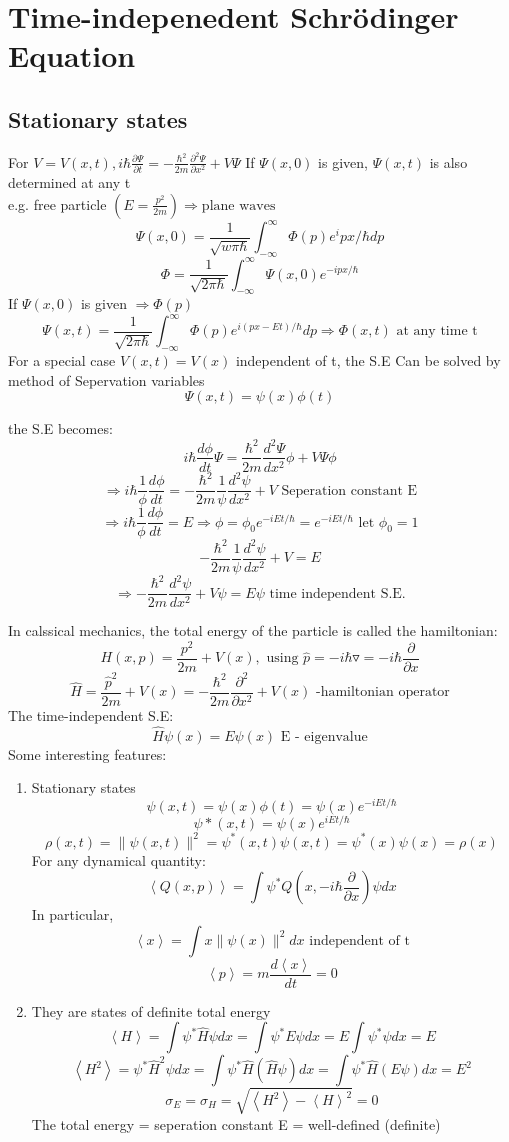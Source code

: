 \documentclass[12pt, a4paper]{article}
\begin{document}
\section{Time-indepenedent Schr\"odinger Equation}
\subsection{Stationary states}
For $V=V(x,t),i\hbar \frac{\partial \Psi}{\partial t}=-\frac{\hbar^2}{2m}\frac{\partial^2\Psi}{\partial x^2}+V\Psi$
If $\Psi(x,0)$ is given, $\Psi(x,t)$ is also determined at any t\\
e.g. free particle $(E=\frac{p^2}{2m})\Rightarrow\text{plane waves}$
$$\Psi(x,0)=\frac{1}{\sqrt{w\pi\hbar}}\int_{-\infty}^{\infty}\Phi(p)e^ipx/\hbar dp$$
$$\Phi=\frac{1}{\sqrt{2\pi \hbar}}\int_{-\infty}^{\infty}\Psi(x,0)e^{-ipx/\hbar}$$
If $\Psi(x,0)$ is given $\Rightarrow \Phi(p)$
$$\Psi(x,t)=\frac{1}{\sqrt{2\pi \hbar}}\int_{-\infty}^{\infty}\Phi(p)e^{i(px-Et)/\hbar}dp\Rightarrow \Phi(x,t) \text{ at any time t}$$ 
For a special case $V(x,t)=V(x)$ independent of t, the S.E Can be solved by method of Sepervation variables
$$\Psi(x,t)=\psi(x)\phi(t)$$

the S.E becomes:
$$i\hbar \frac{d\phi}{dt}\Psi = \frac{\hbar^2}{2m}\frac{d^2\Psi}{dx^2}\phi+V\Psi \phi$$
$$\Rightarrow i\hbar \frac{1}{\phi}\frac{d\phi}{dt}=-\frac{\hbar^2}{2m}\frac{1}{\psi}\frac{d^2\psi}{dx^2}+V\text{ Seperation constant E}$$
$$\Rightarrow i\hbar \frac{1}{\phi}\frac{d\phi}{dt}=E \Rightarrow\phi=\phi_0e^{-iEt/\hbar}=e^{-iEt/\hbar} \text{ let } \phi_0=1$$
$$-\frac{\hbar^2}{2m}\frac{1}{\psi}\frac{d^2\psi}{dx^2}+V=E$$
$$\Rightarrow -\frac{\hbar^2}{2m}\frac{d^2\psi}{dx^2}+V\psi=E\psi \text{ time independent S.E.}$$

In calssical mechanics, the total energy of the particle is called the hamiltonian: $$H(x,p)=\frac{p^2}{2m}+V(x), \text{ using } \hat p=-i\hbar \triangledown=-i\hbar \frac{\partial}{\partial x}$$
$$\hat H=\frac{\hat p^2}{2m}+V(x)=-\frac{\hbar^2}{2m}\frac{\partial ^2}{\partial x^2}+V(x) \text{ -hamiltonian operator}$$
The time-independent S.E: $$\hat H \psi(x)=E\psi(x) \text{ E - eigenvalue}$$
Some interesting features:
\begin{enumerate}
\item Stationary states
$$\psi(x,t)=\psi(x)\phi(t)=\psi(x)e^{-iEt/\hbar}$$
$$\psi*(x,t)=\psi(x)e^{iEt/\hbar}$$
$$\rho(x,t)=\|\psi(x,t)\|^2=\psi^*(x,t)\psi(x,t)=\psi^*(x)\psi(x)=\rho(x)$$
For any dynamical quantity: $$\left<Q(x,p)\right>=\int \psi^* Q(x,-i\hbar\frac{\partial}{\partial x})\psi dx$$
In particular, $$\left< x\right>=\int x\|\psi(x)\|^2dx \text{ independent of t}$$
$$\left< p\right> =m \frac{d\left<x \right>}{dt}=0$$
\item They are states of definite total energy
$$\left<H \right> =\int \psi^* \hat H \psi dx=\int \psi^* E\psi dx=E\int \psi^* \psi dx = E$$
$$\left<H^2 \right>=\psi^* \hat H^2 \psi dx=\int \psi^* \hat H (\hat H \psi)dx=\int \psi^* \hat H(E\psi)dx = E^2$$
$$\sigma_E=\sigma_H=\sqrt{\left<H^2\right> -\left<H\right>^2}=0$$
The total energy = seperation constant E = well-defined (definite)
\end{enumerate}
\end{document}
